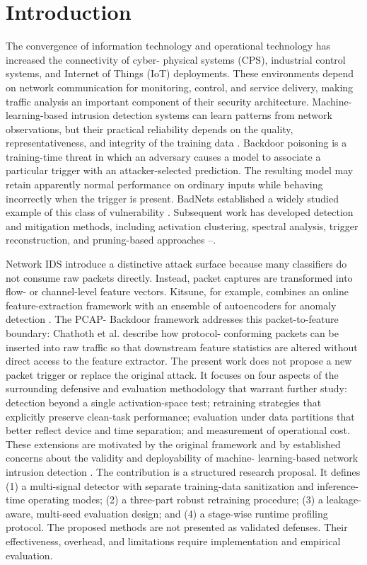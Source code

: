 \documentclass[11pt]{article}
\begin{document}
\section{Introduction}
The convergence of information technology and operational technology has increased the connectivity of cyber- physical systems (CPS), industrial control systems, and Internet of Things (IoT) deployments. These environments depend on network communication for monitoring, control, and service delivery, making traffic analysis an important component of their security architecture. Machine-learning-based intrusion detection systems can learn patterns from network observations, but their practical reliability depends on the quality, representativeness, and integrity of the training data \cite{ref2}. Backdoor poisoning is a training-time threat in which an adversary causes a model to associate a particular trigger with an attacker-selected prediction. The resulting model may retain apparently normal performance on ordinary inputs while behaving incorrectly when the trigger is present. BadNets established a widely studied example of this class of vulnerability \cite{ref3}. Subsequent work has developed detection and mitigation methods, including activation clustering, spectral analysis, trigger reconstruction, and pruning-based approaches \cite{ref4}--\cite{ref7}.

Network IDS introduce a distinctive attack surface because many classifiers do not consume raw packets directly. Instead, packet captures are transformed into flow- or channel-level feature vectors. Kitsune, for example, combines an online feature-extraction framework with an ensemble of autoencoders for anomaly detection \cite{ref8}. The PCAP- Backdoor framework addresses this packet-to-feature boundary: Chathoth et al. \cite{ref1} describe how protocol- conforming packets can be inserted into raw traffic so that downstream feature statistics are altered without direct access to the feature extractor. The present work does not propose a new packet trigger or replace the original attack. It focuses on four aspects of the surrounding defensive and evaluation methodology that warrant further study: detection beyond a single activation-space test; retraining strategies that explicitly preserve clean-task performance; evaluation under data partitions that better reflect device and time separation; and measurement of operational cost. These extensions are motivated by the original framework and by established concerns about the validity and deployability of machine- learning-based network intrusion detection \cite{ref2}. The contribution is a structured research proposal. It defines (1) a multi-signal detector with separate training-data sanitization and inference-time operating modes; (2) a three-part robust retraining procedure; (3) a leakage-aware, multi-seed evaluation design; and (4) a stage-wise runtime profiling protocol. The proposed methods are not presented as validated defenses. Their effectiveness, overhead, and limitations require implementation and empirical evaluation.
\end{document}
